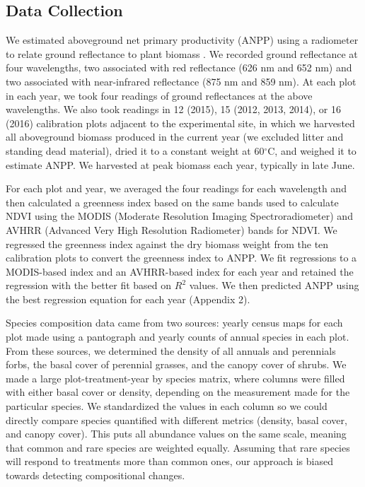 \documentclass[fleqn,10pt,lineno]{wlpeerj} %
\begin{document}
\subsection{Data Collection}\label{data-collection}

We estimated aboveground net primary productivity (ANPP) using a
radiometer to relate ground reflectance to plant biomass \citep[see][
for a review]{Byrne2011}. We recorded ground reflectance at four
wavelengths, two associated with red reflectance (626 nm and 652 nm) and
two associated with near-infrared reflectance (875 nm and 859 nm). At
each plot in each year, we took four readings of ground reflectances at
the above wavelengths. We also took readings in 12 (2015), 15 (2012,
2013, 2014), or 16 (2016) calibration plots adjacent to the experimental
site, in which we harvested all aboveground biomass produced in the
current year (we excluded litter and standing dead material), dried it
to a constant weight at 60\(^{\circ}\)C, and weighed it to estimate
ANPP. We harvested at peak biomass each year, typically in late June.

For each plot and year, we averaged the four readings for each
wavelength and then calculated a greenness index based on the same bands
used to calculate NDVI using the MODIS (Moderate Resolution Imaging
Spectroradiometer) and AVHRR (Advanced Very High Resolution Radiometer)
bands for NDVI. We regressed the greenness index against the dry biomass
weight from the ten calibration plots to convert the greenness index to
ANPP. We fit regressions to a MODIS-based index and an AVHRR-based index
for each year and retained the regression with the better fit based on
\(R^2\) values. We then predicted ANPP using the best regression
equation for each year (Appendix 2).

Species composition data came from two sources: yearly census maps for
each plot made using a pantograph \citep{Hill1920} and yearly counts of
annual species in each plot. From these sources, we determined the
density of all annuals and perennials forbs, the basal cover of
perennial grasses, and the canopy cover of shrubs. We made a large
plot-treatment-year by species matrix, where columns were filled with
either basal cover or density, depending on the measurement made for the
particular species. We standardized the values in each column so we
could directly compare species quantified with different metrics
(density, basal cover, and canopy cover). This puts all abundance values
on the same scale, meaning that common and rare species are weighted
equally. Assuming that rare species will respond to treatments more than
common ones, our approach is biased towards detecting compositional
changes.
\end{document}
